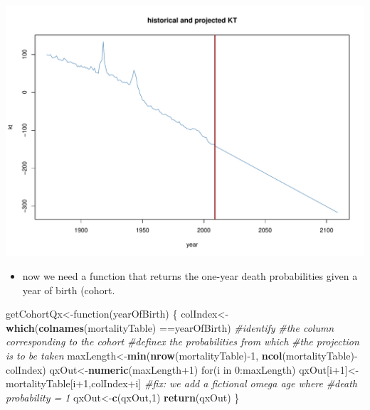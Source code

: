 \documentclass[ignorenonframetext,]{beamer}
\newenvironment{Shaded}{\begin{snugshade}}{\end{snugshade}}
\newcommand{\KeywordTok}[1]{\textcolor[rgb]{0.13,0.29,0.53}{\textbf{{#1}}}}
\newcommand{\DecValTok}[1]{\textcolor[rgb]{0.00,0.00,0.81}{{#1}}}
\newcommand{\CommentTok}[1]{\textcolor[rgb]{0.56,0.35,0.01}{\textit{{#1}}}}
\newcommand{\NormalTok}[1]{{#1}}
\begin{document}
\begin{frame}

\includegraphics{introToLifecontingencies_files/figure-beamer/leecarter2plot-1.pdf}

\end{frame}

\begin{frame}[fragile]

\begin{itemize}[<+->]
\itemsep1pt\parskip0pt
\item
  now we need a function that returns the one-year death probabilities
  given a year of birth (cohort.
\end{itemize}

\begin{Shaded}
\begin{Highlighting}[]
\NormalTok{getCohortQx<-function(yearOfBirth)}
\NormalTok{\{}
  \NormalTok{colIndex<-}\KeywordTok{which}\NormalTok{(}\KeywordTok{colnames}\NormalTok{(mortalityTable)}
                  \NormalTok{==yearOfBirth) }\CommentTok{#identify }
  \CommentTok{#the column corresponding to the cohort }
  \CommentTok{#definex the probabilities from which }
  \CommentTok{#the projection is to be taken}
  \NormalTok{maxLength<-}\KeywordTok{min}\NormalTok{(}\KeywordTok{nrow}\NormalTok{(mortalityTable)-}\DecValTok{1}\NormalTok{,}
                 \KeywordTok{ncol}\NormalTok{(mortalityTable)-colIndex)}
  \NormalTok{qxOut<-}\KeywordTok{numeric}\NormalTok{(maxLength}\DecValTok{+1}\NormalTok{)}
  \NormalTok{for(i in }\DecValTok{0}\NormalTok{:maxLength)}
    \NormalTok{qxOut[i}\DecValTok{+1}\NormalTok{]<-mortalityTable[i}\DecValTok{+1}\NormalTok{,colIndex+i]}
  \CommentTok{#fix: we add a fictional omega age where }
  \CommentTok{#death probability = 1}
  \NormalTok{qxOut<-}\KeywordTok{c}\NormalTok{(qxOut,}\DecValTok{1}\NormalTok{)}
  \KeywordTok{return}\NormalTok{(qxOut)}
\NormalTok{\}}
\end{Highlighting}
\end{Shaded}

\end{frame}
\end{document}
